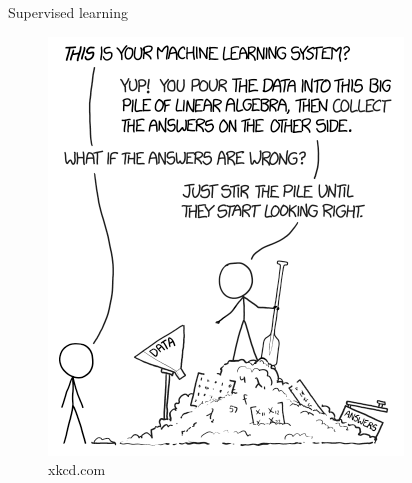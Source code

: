 \begin{frame}{Supervised learning}
  \begin{figure}
	\includegraphics[width=\linewidth,height=0.75\textheight,keepaspectratio]{images/xkcd_machine_learning.png}
	\caption{xkcd.com}
  \end{figure}
\end{frame}

